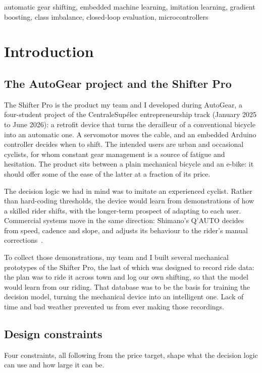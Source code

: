 \documentclass[conference]{IEEEtran}
\begin{document}
\begin{IEEEkeywords}
automatic gear shifting, embedded machine learning, imitation learning, gradient boosting, class imbalance, closed-loop evaluation, microcontrollers
\end{IEEEkeywords}

\section{Introduction}

\subsection{The AutoGear project and the Shifter Pro}
The Shifter Pro is the product my team and I developed during AutoGear, a four-student project of the CentraleSupélec entrepreneurship track (January 2025 to June 2026): a retrofit device that turns the derailleur of a conventional bicycle into an automatic one. A servomotor moves the cable, and an embedded Arduino controller decides when to shift. The intended users are urban and occasional cyclists, for whom constant gear management is a source of fatigue and hesitation. The product sits between a plain mechanical bicycle and an e-bike: it should offer some of the ease of the latter at a fraction of its price.

The decision logic we had in mind was to imitate an experienced cyclist. Rather than hard-coding thresholds, the device would learn from demonstrations of how a skilled rider shifts, with the longer-term prospect of adapting to each user. Commercial systems move in the same direction: Shimano's Q'AUTO decides from speed, cadence and slope, and adjusts its behaviour to the rider's manual corrections~\cite{qauto}.

To collect those demonstrations, my team and I built several mechanical prototypes of the Shifter Pro, the last of which was designed to record ride data: the plan was to ride it across town and log our own shifting, so that the model would learn from our riding. That database was to be the basis for training the decision model, turning the mechanical device into an intelligent one. Lack of time and bad weather prevented us from ever making those recordings.

\subsection{Design constraints}
Four constraints, all following from the price target, shape what the decision logic can use and how large it can be.
\end{document}
